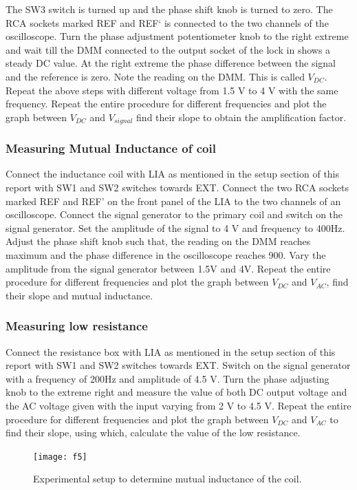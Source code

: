 \documentclass[a4paper, amsfonts, amssymb, amsmath, reprint, showkeys, nofootinbib, twoside]{revtex4-1}
\begin{document}
 The SW3 switch is turned up and the phase shift knob is turned to zero. The RCA sockets marked REF and REF‘ is connected to the two channels of the oscilloscope. Turn the phase adjustment potentiometer knob to the right extreme and wait till the DMM connected to the output socket of the lock in shows a steady DC value. At the right extreme the phase difference between the signal and the reference is zero. Note the reading on the DMM. This is called $V_{DC}$. Repeat the above steps with different voltage from 1.5 V to 4 V with the same frequency. Repeat the entire procedure for different frequencies and
plot the graph between $V_{DC}$ and $V_{signal}$ find their slope to obtain the amplification factor. 

\subsubsection{Measuring Mutual Inductance of coil}
Connect the inductance coil with LIA as mentioned in the setup section of this report with SW1 and SW2 switches towards EXT. Connect the two RCA sockets marked REF and REF’ on the front panel of the LIA to the two channels of an oscilloscope. Connect the signal generator to the primary coil and switch
on the signal generator. Set the amplitude of the signal to 4 V and frequency to 400Hz. Adjust the phase shift knob such that, the reading on the
DMM reaches maximum and the phase difference in
the oscilloscope reaches 900. Vary the amplitude from the signal generator between
1.5V and 4V. Repeat the entire procedure for different frequencies and plot the graph between $V_{DC}$ and $V_{AC}$, find their slope and mutual inductance.

\subsubsection{Measuring low resistance}
Connect the resistance box with LIA as mentioned in the
setup section of this report with SW1 and SW2 switches
towards EXT. Switch on the signal generator with a frequency of 200Hz and amplitude of 4.5 V. Turn the phase adjusting knob to the extreme right and
measure the value of both DC output voltage and the AC
voltage given with the input varying from 2 V to 4.5 V. Repeat the entire procedure for different frequencies and
plot the graph between $V_{DC}$ and $V_{AC}$ to find their slope, using which, calculate the value of the low resistance.

\begin{figure}[h]
	\centering
	\texttt{[image: f5]} 
	\caption{Experimental setup to determine mutual inductance of the coil.}
	\label{f5}
\end{figure}
\end{document}
